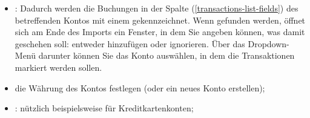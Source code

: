 \begin{enumerate}
\begin{itemize}
			\item {}: %
			Dadurch werden die Buchungen in der Spalte  (\vref{transactions-list-fields}) des betreffenden Kontos mit einem  gekennzeichnet. 
			Wenn  gefunden werden, öffnet sich am Ende des Imports ein Fenster, in dem Sie angeben können, was damit geschehen soll: entweder hinzufügen oder ignorieren. Über das Dropdown-Menü  darunter können Sie das Konto auswählen, in dem die Transaktionen markiert werden sollen.
			\item die Währung des Kontos festlegen (oder ein neues Konto erstellen);
			\item {}: nützlich beispielsweise für Kreditkartenkonten;

\end{itemize}
\end{enumerate}

